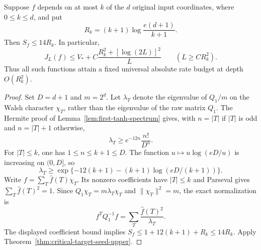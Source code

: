 \begin{corollary}
\label{cor:critical-junta-seed}
Suppose $f$ depends on at most $k$ of the $d$ original input coordinates,
where $0\le k\le d$, and put
\[
 R_k=(k+1)\log\frac{e(d+1)}{k+1}.
\]
Then $S_f\le14R_k$. In particular,
\[
 J_L(f)\le V_*+C\frac{R_k^2+[\log(2L)]^2}{L}
 \qquad(L\ge CR_k^2).
\]
Thus all such functions attain a fixed universal absolute rate budget
at depth $O(R_k^2)$.
\end{corollary}

\begin{proof}
Set $D=d+1$ and $m=2^d$. Let $\lambda_T$ denote the eigenvalue of
$Q_1/m$ on the Walsh character $\chi_T$, rather than the eigenvalue
of the raw matrix $Q_1$. The Hermite proof of
Lemma~\ref{lem:first-tanh-spectrum} gives, with $n=|T|$ if $|T|$
is odd and $n=|T|+1$ otherwise,
\[
 \lambda_T\ge e^{-12n}\frac{n!}{D^n}.
\]
For $|T|\le k$, one has $1\le n\le k+1\le D$. The function
$u\mapsto u\log(eD/u)$ is increasing on $(0,D]$, so
\[
 \lambda_T\ge
 \exp\{-12(k+1)-(k+1)\log(eD/(k+1))\}.
\]
Write $f=\sum_T\widehat f(T)\chi_T$. Its nonzero coefficients have
$|T|\le k$ and Parseval gives $\sum_T\widehat f(T)^2=1$.
Since $Q_1\chi_T=m\lambda_T\chi_T$ and
$\|\chi_T\|^2=m$, the exact normalization is
\[
 f^TQ_1^{-1}f=\sum_T\frac{\widehat f(T)^2}{\lambda_T}.
\]
The displayed coefficient bound implies
$S_f\le1+12(k+1)+R_k\le14R_k$. Apply
Theorem~\ref{thm:critical-target-seed-upper}.
\end{proof}
